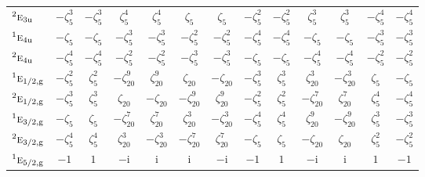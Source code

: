 \documentclass[10pt,a4paper]{article}
\makeatletter
\def\grouprule#1#2{\noalign{\marks\LTgroupmarks{\the\belowrulesep}\nobreak\vskip#1%
  \vskip\aboverulesep}\multispan\LT@cols\unskip{\leaders\hrule\@height#2\hfill\kern\z@}\cr
  \noalign{\penalty\LTrulebreak\vskip\belowrulesep\global\@lastruleclass\z@}}
\numberwithin{equation}{section}
\newcommand{\irr}[1]{\text{\normalfont\scshape #1}}
\newcommand{\conjpair}[1]{{}^{#1}}
\newcommand{\ptag}[1]{\mathrm{#1}}
\newcommand{\iunit}{\mathrm{i}}
\newcommand{\rootunity}[1]{\zeta_{#1}}
\makeatother
\begin{document}
{\begin{longtable}{@{}lcccccccccccc@{}}
$\conjpair{2}\irr{e}_{3\ptag{u}}$ & $-\rootunity{5}^{3}$ & $-\rootunity{5}^{3}$ & $\rootunity{5}^{4}$ & $\rootunity{5}^{4}$ & $\rootunity{5}$ & $\rootunity{5}$ & $-\rootunity{5}^{2}$ & $-\rootunity{5}^{2}$ & $\rootunity{5}^{3}$ & $\rootunity{5}^{3}$ & $-\rootunity{5}^{4}$ & $-\rootunity{5}^{4}$\\
$\conjpair{1}\irr{e}_{4\ptag{u}}$ & $-\rootunity{5}$ & $-\rootunity{5}$ & $-\rootunity{5}^{3}$ & $-\rootunity{5}^{3}$ & $-\rootunity{5}^{2}$ & $-\rootunity{5}^{2}$ & $-\rootunity{5}^{4}$ & $-\rootunity{5}^{4}$ & $-\rootunity{5}$ & $-\rootunity{5}$ & $-\rootunity{5}^{3}$ & $-\rootunity{5}^{3}$\\
$\conjpair{2}\irr{e}_{4\ptag{u}}$ & $-\rootunity{5}^{4}$ & $-\rootunity{5}^{4}$ & $-\rootunity{5}^{2}$ & $-\rootunity{5}^{2}$ & $-\rootunity{5}^{3}$ & $-\rootunity{5}^{3}$ & $-\rootunity{5}$ & $-\rootunity{5}$ & $-\rootunity{5}^{4}$ & $-\rootunity{5}^{4}$ & $-\rootunity{5}^{2}$ & $-\rootunity{5}^{2}$\\
\grouprule{0pt}{\lightrulewidth}
$\conjpair{1}\irr{e}_{1/2,\ptag{g}}$ & $-\rootunity{5}^{2}$ & $\rootunity{5}^{2}$ & $-\rootunity{20}^{9}$ & $\rootunity{20}^{9}$ & $\rootunity{20}$ & $-\rootunity{20}$ & $-\rootunity{5}^{3}$ & $\rootunity{5}^{3}$ & $\rootunity{20}^{3}$ & $-\rootunity{20}^{3}$ & $\rootunity{5}$ & $-\rootunity{5}$\\
$\conjpair{2}\irr{e}_{1/2,\ptag{g}}$ & $-\rootunity{5}^{3}$ & $\rootunity{5}^{3}$ & $\rootunity{20}$ & $-\rootunity{20}$ & $-\rootunity{20}^{9}$ & $\rootunity{20}^{9}$ & $-\rootunity{5}^{2}$ & $\rootunity{5}^{2}$ & $-\rootunity{20}^{7}$ & $\rootunity{20}^{7}$ & $\rootunity{5}^{4}$ & $-\rootunity{5}^{4}$\\
$\conjpair{1}\irr{e}_{3/2,\ptag{g}}$ & $-\rootunity{5}$ & $\rootunity{5}$ & $-\rootunity{20}^{7}$ & $\rootunity{20}^{7}$ & $\rootunity{20}^{3}$ & $-\rootunity{20}^{3}$ & $-\rootunity{5}^{4}$ & $\rootunity{5}^{4}$ & $\rootunity{20}^{9}$ & $-\rootunity{20}^{9}$ & $\rootunity{5}^{3}$ & $-\rootunity{5}^{3}$\\
$\conjpair{2}\irr{e}_{3/2,\ptag{g}}$ & $-\rootunity{5}^{4}$ & $\rootunity{5}^{4}$ & $\rootunity{20}^{3}$ & $-\rootunity{20}^{3}$ & $-\rootunity{20}^{7}$ & $\rootunity{20}^{7}$ & $-\rootunity{5}$ & $\rootunity{5}$ & $-\rootunity{20}$ & $\rootunity{20}$ & $\rootunity{5}^{2}$ & $-\rootunity{5}^{2}$\\
$\conjpair{1}\irr{e}_{5/2,\ptag{g}}$ & $-1$ & $1$ & $-\iunit{}$ & $\iunit{}$ & $\iunit{}$ & $-\iunit{}$ & $-1$ & $1$ & $-\iunit{}$ & $\iunit{}$ & $1$ & $-1$\\

\end{longtable}}
\end{document}
